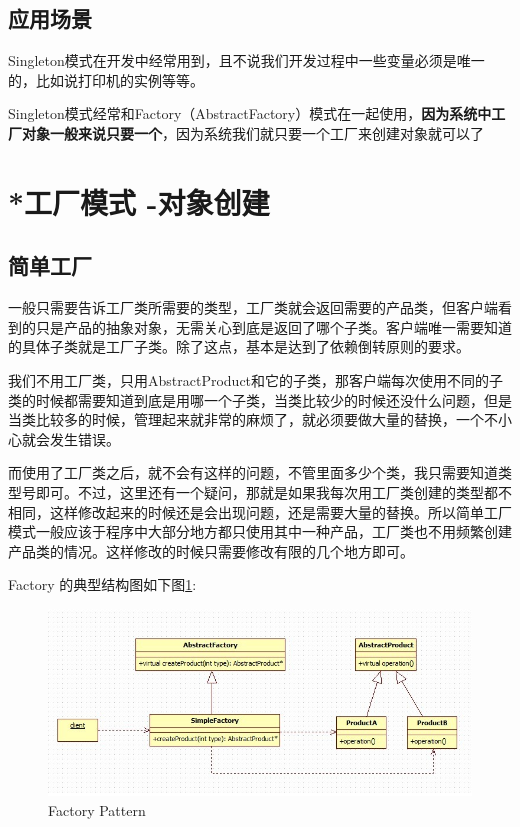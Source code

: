 \documentclass[UTF8,a4paper,12pt]{ctexbook}
\begin{document}
	\subsection{应用场景}
		Singleton模式在开发中经常用到，且不说我们开发过程中一些变量必须是唯一的，比如说打印机的实例等等。
		
		Singleton模式经常和Factory（AbstractFactory）模式在一起使用，\textbf{因为系统中工厂对象一般来说只要一个}，因为系统我们就只要一个工厂来创建对象就可以了
\newpage
\section{*工厂模式 -对象创建}
	\subsection{简单工厂}
		一般只需要告诉工厂类所需要的类型，工厂类就会返回需要的产品类，但客户端看到的只是产品的抽象对象，无需关心到底是返回了哪个子类。客户端唯一需要知道的具体子类就是工厂子类。除了这点，基本是达到了依赖倒转原则的要求。
		
		我们不用工厂类，只用AbstractProduct和它的子类，那客户端每次使用不同的子类的时候都需要知道到底是用哪一个子类，当类比较少的时候还没什么问题，但是当类比较多的时候，管理起来就非常的麻烦了，就必须要做大量的替换，一个不小心就会发生错误。
		
		而使用了工厂类之后，就不会有这样的问题，不管里面多少个类，我只需要知道类型号即可。不过，这里还有一个疑问，那就是如果我每次用工厂类创建的类型都不相同，这样修改起来的时候还是会出现问题，还是需要大量的替换。所以简单工厂模式一般应该于程序中大部分地方都只使用其中一种产品，工厂类也不用频繁创建产品类的情况。这样修改的时候只需要修改有限的几个地方即可。
		
		Factory 的典型结构图如下图\ref{FactorySimple}:
		\begin{figure}[h]
			\centering
			\includegraphics[width = 14cm]{FactorySimple.jpg}
			\caption{Factory Pattern}
			\label{FactorySimple}
		\end{figure}
\end{document}
